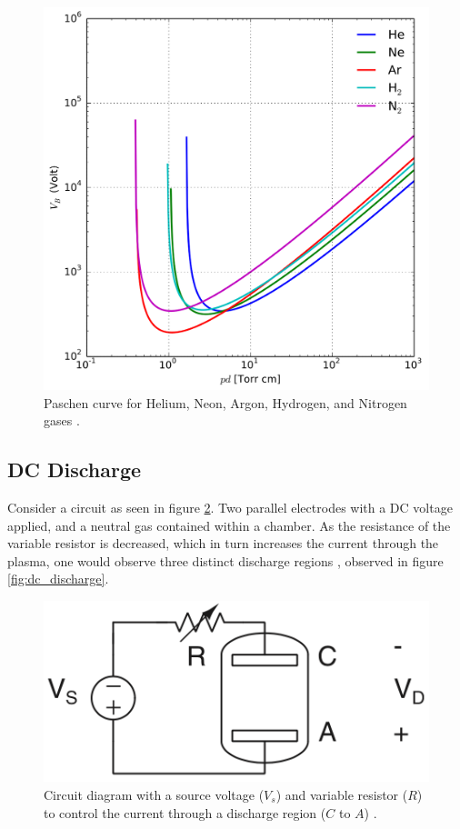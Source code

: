\begin{figure}[h!]
	\centering
	\includegraphics[width=0.6\linewidth]{chapter_2/figures/paschen_curve.png}
	\caption{Paschen curve for Helium, Neon, Argon, Hydrogen, and Nitrogen gases \cite{Lieberman2005}.}
	\label{fig:pashen_curve}
\end{figure}

\subsection{DC Discharge}

Consider a circuit as seen in figure \ref{fig:basic_circuit}. Two parallel electrodes with a DC voltage applied, and a neutral gas contained within a chamber. As the resistance of the variable resistor is decreased, which in turn increases the current through the plasma, one would observe three distinct discharge regions \cite{Gudmundsson2017}, observed in figure \ref{fig:dc_discharge}.

\begin{figure}[h!]
	\centering
	\includegraphics[width=0.6\linewidth]{chapter_2/figures/basic_circuit.png}
	\caption{Circuit diagram with a source voltage ($V_s$) and variable resistor ($R$) to control the current through a discharge region ($C$ to $A$) \cite{Gudmundsson2017}.}
	\label{fig:basic_circuit}
\end{figure}

